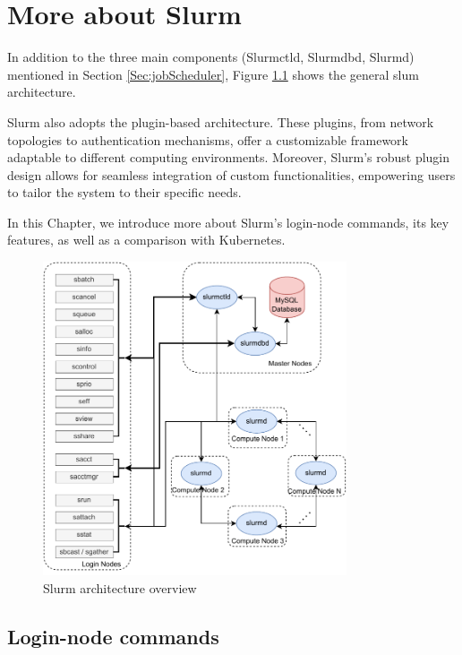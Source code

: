 \chapter{More about Slurm}

In addition to the three main components (Slurmctld, Slurmdbd, Slurmd) mentioned in Section \ref{Sec:jobScheduler}, Figure \ref{fig_slurm_overview} shows the general slum architecture.

Slurm also adopts the plugin-based architecture. These plugins, from network topologies to authentication mechanisms, offer a customizable framework adaptable to different computing environments. Moreover, Slurm's robust plugin design allows for seamless integration of custom functionalities, empowering users to tailor the system to their specific needs.

In this Chapter, we introduce more about Slurm's login-node commands, its key features, as well as a comparison with Kubernetes.

\begin{figure}[tb]
    \centering
    \includegraphics[width=0.8\textwidth]{figures/slurm-overview.pdf}
    \caption{Slurm architecture overview}
    \label{fig_slurm_overview}
\end{figure}



\section{Login-node commands}

